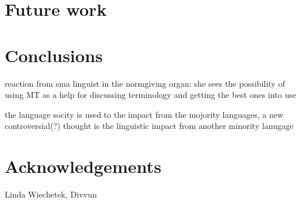 \documentclass[a4paper,11pt,twocolumn]{article}
\begin{document}
\section{Future work}
\section{Conclusions}

 reaction from sma linguist in the normgiving organ: she sees the possibility of using MT as a help for discussing terminology and getting the best ones into use

 the language socity is used to the impact from the mojority languages, a new controversial(?) thought is the linguistic impact from another minority lanugage 


\section*{Acknowledgements}

Linda Wiechetek, Divvun



\end{document}

